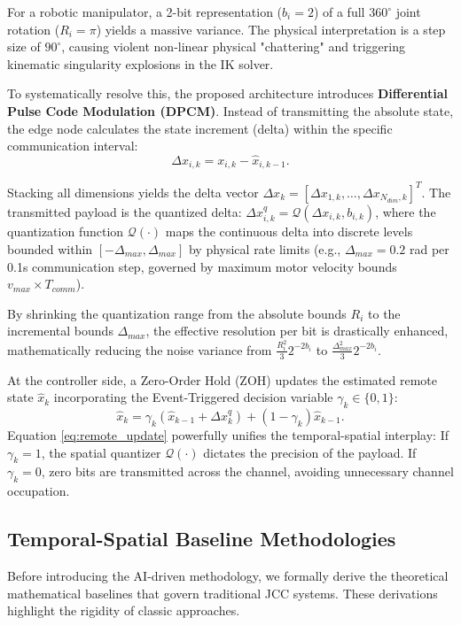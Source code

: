 For a robotic manipulator, a 2-bit representation ($b_i=2$) of a full $360^\circ$ joint rotation ($R_i = \pi$) yields a massive variance. The physical interpretation is a step size of $90^\circ$, causing violent non-linear physical "chattering" and triggering kinematic singularity explosions in the IK solver.

To systematically resolve this, the proposed architecture introduces \textbf{Differential Pulse Code Modulation (DPCM)}. Instead of transmitting the absolute state, the edge node calculates the state increment (delta) within the specific communication interval:
\begin{equation}
    \Delta x_{i,k} = x_{i,k} - \hat{x}_{i,k-1}.
\end{equation}

Stacking all dimensions yields the delta vector $\Delta x_k = [\Delta x_{1,k}, \dots, \Delta x_{N_{dim},k}]^T$. The transmitted payload is the quantized delta: $\Delta x_{i,k}^q = \mathcal{Q}(\Delta x_{i,k}, b_{i,k})$, where the quantization function $\mathcal{Q}(\cdot)$ maps the continuous delta into discrete levels bounded within $[-\Delta_{max}, \Delta_{max}]$ by physical rate limits (e.g., $\Delta_{max}=0.2$ rad per 0.1s communication step, governed by maximum motor velocity bounds $v_{max} \times T_{comm}$). 

By shrinking the quantization range from the absolute bounds $R_i$ to the incremental bounds $\Delta_{max}$, the effective resolution per bit is drastically enhanced, mathematically reducing the noise variance from $\frac{R_i^2}{3} 2^{-2b_i}$ to $\frac{\Delta_{max}^2}{3} 2^{-2b_i}$.

At the controller side, a Zero-Order Hold (ZOH) updates the estimated remote state $\hat{x}_k$ incorporating the Event-Triggered decision variable $\gamma_k \in \{0,1\}$:
\begin{equation} \label{eq:remote_update}
    \hat{x}_k = \gamma_k (\hat{x}_{k-1} + \Delta x_k^q) + (1 - \gamma_k) \hat{x}_{k-1}.
\end{equation}
Equation \ref{eq:remote_update} powerfully unifies the temporal-spatial interplay: If $\gamma_k=1$, the spatial quantizer $\mathcal{Q}(\cdot)$ dictates the precision of the payload. If $\gamma_k=0$, zero bits are transmitted across the channel, avoiding unnecessary channel occupation.

\subsection{Temporal-Spatial Baseline Methodologies}
Before introducing the AI-driven methodology, we formally derive the theoretical mathematical baselines that govern traditional JCC systems. These derivations highlight the rigidity of classic approaches.

